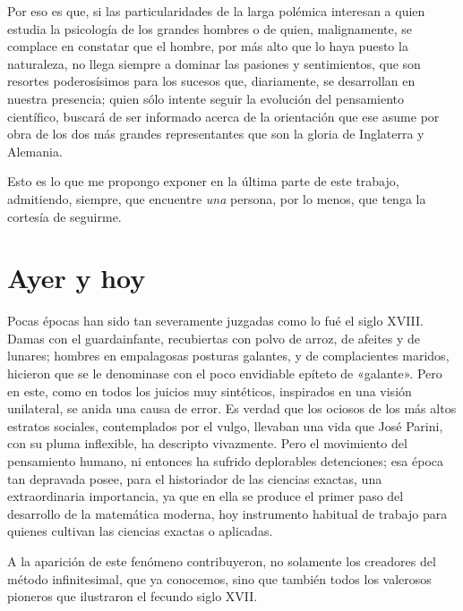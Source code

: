 \documentclass[a4paper, 12pt, draft]{article}
\begin{document}
{%

Por eso es que, si las particularidades de la larga polémica interesan a quien estudia la psicología de los grandes hombres o de quien, malignamente, se complace en constatar que el hombre, por más alto que lo haya puesto la naturaleza, no llega siempre a dominar las pasiones y sentimientos, que son resortes poderosísimos para los sucesos que, diariamente, se desarrollan en nuestra presencia; quien sólo intente seguir la evolución del pensamiento científico, buscará de ser informado acerca de la orientación que ese asume por obra de los dos más grandes representantes que son la gloria de Inglaterra y Alemania.

Esto es lo que me propongo exponer en la última parte de este trabajo, admitiendo, siempre, que encuentre \textit{ una} persona, por lo menos, que tenga la cortesía de seguirme.



\newpage

\section*{Ayer y hoy}




Pocas épocas han sido tan severamente juzgadas como lo fué el siglo XVIII. Damas con el guardainfante, recubiertas con polvo de arroz, de afeites y de lunares; hombres en empalagosas posturas galantes, y de complacientes maridos, hicieron que se le denominase con el poco envidiable epíteto de «galante». Pero en este, como en todos los juicios muy sintéticos, inspirados en una visión unilateral, se anida una causa de error. Es verdad que los ociosos de los más altos estratos sociales, contemplados por el vulgo, llevaban una vida que José Parini, con su pluma inflexible, ha descripto vivazmente. Pero el movimiento del pensamiento humano, ni entonces ha sufrido deplorables detenciones; esa época tan depravada posee, para el historiador de las ciencias exactas, una extraordinaria importancia, ya que en ella se produce el primer paso del desarrollo de la matemática moderna, hoy instrumento habitual de trabajo para quienes cultivan las ciencias exactas o aplicadas.

A la aparición de este fenómeno contribuyeron, no solamente los creadores del método infinitesimal, que ya conocemos, sino que también todos los valerosos pioneros que ilustraron el fecundo siglo XVII.

}
\end{document}
